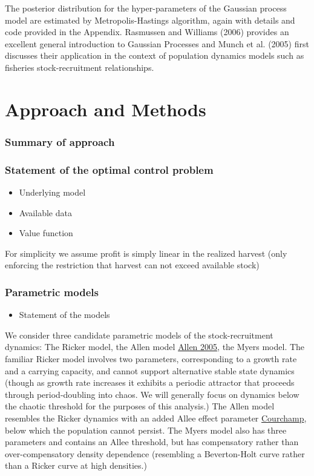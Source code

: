 \documentclass[author-year, review]{elsarticle} %
\begin{document}
The posterior distribution for the hyper-parameters of the Gaussian
process model are estimated by Metropolis-Hastings algorithm, again with
details and code provided in the Appendix. Rasmussen and Williams (2006)
provides an excellent general introduction to Gaussian Processes and
Munch et al. (2005) first discusses their application in the context of
population dynamics models such as fisheries stock-recruitment
relationships.

\section{Approach and Methods}\label{approach-and-methods}

\subsubsection{Summary of approach}\label{summary-of-approach}

\subsubsection{Statement of the optimal control
problem}\label{statement-of-the-optimal-control-problem}

\begin{itemize}
\itemsep1pt\parskip0pt
\item
  Underlying model
\item
  Available data
\item
  Value function
\end{itemize}

For simplicity we assume profit is simply linear in the realized harvest
(only enforcing the restriction that harvest can not exceed available
stock)

\subsubsection{Parametric models}\label{parametric-models}

\begin{itemize}
\itemsep1pt\parskip0pt
\item
  Statement of the models
\end{itemize}

We consider three candidate parametric models of the stock-recruitment
dynamics: The Ricker model, the Allen model \href{}{Allen 2005}, the
Myers model. The familiar Ricker model involves two parameters,
corresponding to a growth rate and a carrying capacity, and cannot
support alternative stable state dynamics (though as growth rate
increases it exhibits a periodic attractor that proceeds through
period-doubling into chaos. We will generally focus on dynamics below
the chaotic threshold for the purposes of this analysis.) The Allen
model resembles the Ricker dynamics with an added Allee effect parameter
\href{}{Courchamp}, below which the population cannot persist. The Myers
model also has three parameters and contains an Allee threshold, but has
compensatory rather than over-compensatory density dependence
(resembling a Beverton-Holt curve rather than a Ricker curve at high
densities.)
\end{document}
